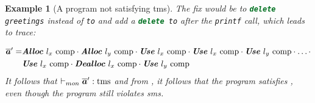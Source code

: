 \documentclass[dvipsnames]{llncs}
\newtheorem{exampleenv}{Example}[section]
\begin{document}
\begin{exampleenv}[A program not satisfying \gls*{tms}]
  The fix would be to \lstinline[language=c++,basicstyle=\small\ttfamily]|delete greetings| instead of \texttt{to} and add a \lstinline[language=c++,basicstyle=\small\ttfamily]|delete to| after the \texttt{printf} call, which leads to trace: 
  
\vspace{-1em}
  {\small
  \begin{align*}
  	\abstrace[']=
  	&
  	\absev{Alloc}\ \loc[_{x}]\ \comp
  	\cdot
  	\absev{Alloc}\ \loc[_{y}]\ \comp
  	\cdot
  	\absev{Use}\ \loc[_{x}]\ \comp
  	\cdot
  	\absev{Use}\ \loc[_{x}]\ \comp
  	\cdot
  	\absev{Use}\ \loc[_{y}]\ \comp
  	\cdot
  	\ldots
  	\cdot
  	\\
  	&
  	\absev{Use}\ \loc[_{x}]\ \comp
  	\cdot
  	\absev{Dealloc}\ \loc[_{x}]\ \comp
  	\cdot
  	\absev{Use}\ \loc[_{y}]\ \comp	
  \end{align*}
  }
  It follows that $\montmssafe{\abstrace[']}$ and from , it follows that the program satisfies , even though the program still violates \gls*{sms}.
\end{exampleenv}

\end{document}
